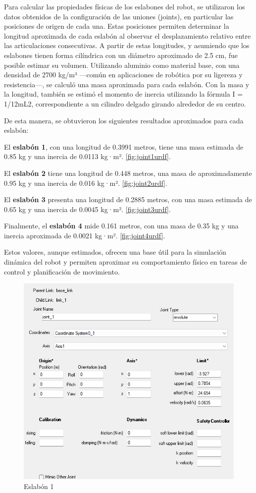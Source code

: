 Para calcular las propiedades físicas de los eslabones del robot, se utilizaron los datos obtenidos de la configuración de las uniones (joints), en particular las posiciones de origen de cada una. Estas posiciones permiten determinar la longitud aproximada de cada eslabón al observar el desplazamiento relativo entre las articulaciones consecutivas. A partir de estas longitudes, y asumiendo que los eslabones tienen forma cilíndrica con un diámetro aproximado de 2.5 cm, fue posible estimar su volumen. Utilizando aluminio como material base, con una densidad de 2700 kg/m³ —común en aplicaciones de robótica por su ligereza y resistencia—, se calculó una masa aproximada para cada eslabón. Con la masa y la longitud, también se estimó el momento de inercia utilizando la fórmula I = 1/12mL2, correspondiente a un cilindro delgado girando alrededor de su centro.

De esta manera, se obtuvieron los siguientes resultados aproximados para cada eslabón:

El \textbf{eslabón 1}, con una longitud de 0.3991 metros, tiene una masa estimada de 0.85 kg y una inercia de 0.0113 kg·m². \autoref{fig:joint1urdf}.

El \textbf{eslabón 2} tiene una longitud de 0.448 metros, una masa de aproximadamente 0.95 kg y una inercia de 0.016 kg·m². \autoref{fig:joint2urdf}.

El \textbf{eslabón 3} presenta una longitud de 0.2885 metros, con una masa estimada de 0.65 kg y una inercia de 0.0045 kg·m². \autoref{fig:joint3urdf}.

Finalmente, el \textbf{eslabón 4} mide 0.161 metros, con una masa de 0.35 kg y una inercia aproximada de 0.0021 kg·m². \autoref{fig:joint4urdf}.

Estos valores, aunque estimados, ofrecen una base útil para la simulación dinámica del robot y permiten aproximar su comportamiento físico en tareas de control y planificación de movimiento.

\begin{figure}
	\centering
	\includegraphics[width=0.3\linewidth]{img/JOINT1URDF}
	\caption{Eslabón 1}
	\label{fig:joint1urdf}
\end{figure}

